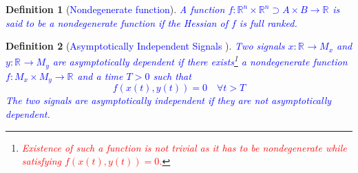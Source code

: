 \documentclass{article}
\newcommand{\R}[1]{\mathbb{R}^{#1}}
\newtheorem{definition}{Definition}
\newcommand{\textblue}[1]{\textcolor{blue}{#1}}
\begin{document}
\begin{definition}[\textblue{Nondegenerate function}]\label{def:nondegenerate_function}
\textblue{A function $f: \R{n}\times \R{n} \supset A\times B \to \R{}$ is said to be a nondegenerate function if the Hessian of $f$ is full ranked.}
\end{definition}

\begin{definition}[\textblue{Asymptotically Independent Signals \cite{mahony_complementaryFilter}}]
\textblue{Two signals $x : \R{} \to M_x$ and $y : \R{} \to M_y$ are \emph{asymptotically dependent} if there exists\footnote{\textcolor{red}{Existence of such a function is not trivial as it has to be nondegenerate while satisfying $f(x(t), y(t))= 0$.}} a nondegenerate function $f : M_x\times M_y \to \R{}$ and a time $T>0$ such that \[f(x(t), y(t)) = 0 \quad \forall t > T\]
The two signals are asymptotically independent if they are not asymptotically dependent.      }
\end{definition}
\end{document}
